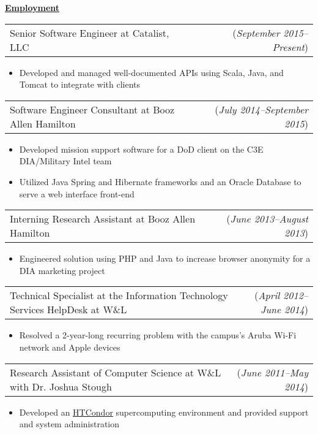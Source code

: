 \documentclass[11pt, letterpaper]{letter}
\makeatletter
\newlength{\indwidth}            \setlength{\indwidth}{\textwidth-.4in}
\newlength{\listSpacing}         \setlength{\listSpacing}{.0375in}
\newlength{\firstSectionSpacing} \setlength{\firstSectionSpacing}{6pt}
\newlength{\sectionSpacing}      \setlength{\sectionSpacing}{-1pt}
\newlength{\headerAntispace}     \setlength{\headerAntispace}{-6pt}
\newlength{\subListAntispace}    \setlength{\subListAntispace}{-.25in}
\newlength{\subListMidAntispace} \setlength{\subListMidAntispace}{-2.5pt}
\newlength{\subListEndAntispace} \setlength{\subListEndAntispace}{-.075in}
\newcommand{\lst}[1]{
    \vspace{\subListAntispace}
    \begin{itemize}
        \item #1
    \end{itemize}
    \vspace{\subListEndAntispace}
}
\newcommand{\dated}[2]{
    \begin{tabular*}{\indwidth}{l@{\extracolsep{\fill}}r}
        #1 & (\textit{#2})
    \end{tabular*}
}
\newcommand{\myul}[3]{
    \begingroup
        \renewcommand{\ULdepth}{#1}
        \renewcommand{\ULthickness}{#2}
        \uline{#3}
    \endgroup
}
\newcommand{\sectionheader}[1]{
    \myul{2.7pt}{0.5pt}{\large \textbf{#1}}
}
\makeatother
\begin{document}
\vspace{\firstSectionSpacing}
\vspace{\sectionSpacing}



\sectionheader{Employment}
\vspace{\headerAntispace}
\begin{itemize}{
    \setlength{\itemsep}{\listSpacing}
    \item \dated{Senior Software Engineer at Catalist, LLC}{September 2015--Present}
    \lst{
        Developed and managed well-documented APIs using Scala, Java, and Tomcat to
        integrate with clients
    }
    \item \dated{
        Software Engineer Consultant at Booz Allen Hamilton
    }{July 2014--September 2015}
    \lst{
        Developed mission support software for a DoD client on the C3E DIA/Military
        Intel team
    \vspace{\subListMidAntispace}
    \item {
        Utilized Java Spring and Hibernate frameworks and an Oracle Database to serve
        a web interface front-end
    }
    \vspace{\subListMidAntispace}
    }
    \item \dated{
        Interning Research Assistant at Booz Allen Hamilton
    }{June 2013--August 2013}
    \lst{
        Engineered solution using PHP and Java to increase browser anonymity for a DIA
        marketing project
    }
    \item \dated{
        Technical Specialist at the Information Technology Services HelpDesk at W\&L
    }{April 2012--June 2014}
    \lst{
        Resolved a 2-year-long recurring problem with the campus's Aruba Wi-Fi network
        and Apple devices
    }
    \item \dated{
        Research Assistant of Computer Science at W\&L with Dr. Joshua Stough
    }{June 2011--May 2014}
    \lst{
        Developed an \href{http://www.htcondorproject.org/}{HTCondor} supercomputing
        environment and provided support and system administration
}}
\end{itemize}
\end{document}
